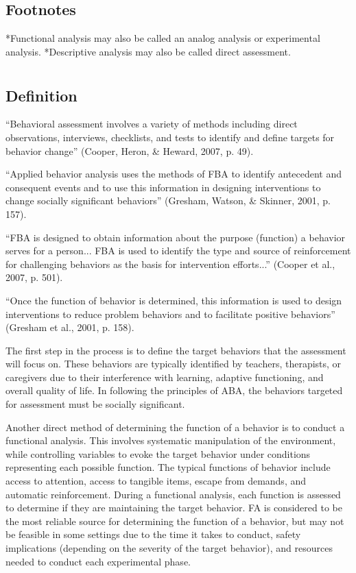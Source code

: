 \subsection{Footnotes}
*Functional analysis may also be called an analog analysis or experimental analysis.
*Descriptive analysis may also be called direct assessment.
%
\clearpage \section[\fouriThree{}]{\fouriThree{}%
              }
\subsection{Definition}
``Behavioral assessment involves a variety of methods including direct observations, interviews, checklists, and tests to identify and define targets for behavior change'' (Cooper, Heron, \& Heward, 2007, p. 49).

``Applied behavior analysis uses the methods of FBA to identify antecedent and consequent events and to use this information in designing interventions to change socially significant behaviors'' (Gresham, Watson, \& Skinner, 2001, p. 157).

``FBA is designed to obtain information about  the purpose (function) a behavior serves for a person... FBA is used to identify the type and source of reinforcement for challenging behaviors as the basis for intervention efforts...'' (Cooper et al., 2007, p. 501).

``Once the function of behavior is determined, this information is used to design interventions to reduce problem behaviors and to facilitate positive behaviors'' (Gresham et al., 2001, p. 158).

The first step in the process is to define the target behaviors that the assessment will focus on. These behaviors are typically identified by teachers, therapists, or caregivers due to their interference with learning, adaptive functioning, and overall quality of life. In following the principles of ABA, the behaviors targeted for assessment must be socially significant.

Another direct method of determining the function of a behavior is to conduct a functional analysis. This involves systematic manipulation of the environment, while controlling variables to evoke the target behavior under conditions representing each possible function. The typical functions of behavior include access to attention, access to tangible items, escape from demands, and automatic reinforcement. During a functional analysis, each function is assessed to determine if they are maintaining the target behavior. FA is considered to be the most reliable source for determining the function of a behavior, but may not be feasible in some settings due to the time it takes to conduct, safety implications (depending on the severity of the target behavior), and resources needed to conduct each experimental phase.

